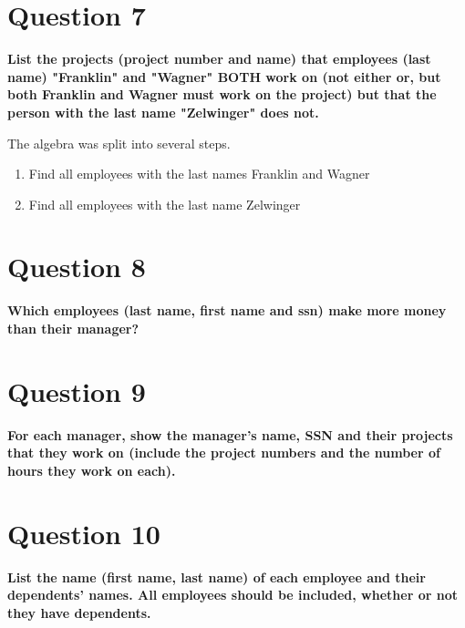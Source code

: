 \documentclass{article}
\begin{document}
\section{Question 7}

    \textbf{List the projects (project number and name) that employees (last name)  "Franklin" and "Wagner" BOTH work on (not either or, but both Franklin and Wagner must work on the project) but that the person with the last name "Zelwinger" does not.}
    
    The algebra was split into several steps.

    \begin{enumerate}
        \item Find all employees with the last names Franklin and Wagner
        \item Find all employees with the last name Zelwinger
    \end{enumerate}

\section{Question 8}

    \textbf{Which employees (last name, first name and ssn) make more money than their manager?}

\section{Question 9}

    \textbf{For each manager, show the manager's name, SSN and their projects that they work on (include the project numbers and the number of hours they work on each).}

\section{Question 10}

    \textbf{List the name (first name, last name) of each employee and their dependents' names.  All employees should be included, whether or not they have dependents.}
    
\end{document}
